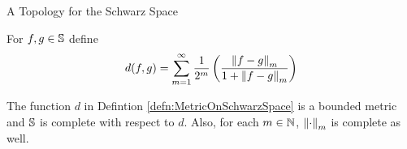 \begin{section}{A Topology for the Schwarz Space}

\begin{defn}\label{defn:MetricOnSchwarzSpace}
	For $f,g \in \schwarz$ define
		\begin{displaymath}
			d(f,g) = \sum_{m=1}^\infty \frac{1}{2^m} \left(
				\frac{\norm[m]{f-g}}{1+\norm[m]{f-g}} \right)
		\end{displaymath}
\end{defn}


\begin{prop}
	The function $d$ in Defintion \ref{defn:MetricOnSchwarzSpace} is a bounded
	metric and $\schwarz$ is complete with respect to $d$. Also, for each $\isnatrl[m]$,
	$\norm[m]{\cdot}$ is complete as well.
\end{prop}


\end{section}
